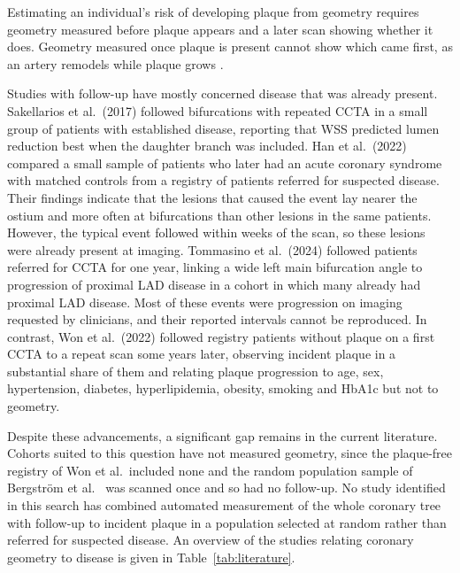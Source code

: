 Estimating an individual's risk of developing plaque from geometry requires geometry measured before
plaque appears and a later scan showing whether it does.
Geometry measured once plaque is present cannot show which came first, as an artery remodels while
plaque grows \cite{glagov1987remodeling}.

Studies with follow-up have mostly concerned disease that was already present.
Sakellarios et al.\ (2017) \cite{sakellarios2017bifurcation} followed bifurcations with repeated
CCTA in a small group of patients with established disease, reporting that WSS predicted lumen
reduction best when the daughter branch was included.
Han et al.\ (2022) \cite{han2022plaque} compared a small sample of patients who later had an acute
coronary syndrome with matched controls from a registry of patients referred for suspected disease.
Their findings indicate that the lesions that caused the event lay nearer the ostium and more often
at bifurcations than other lesions in the same patients.
However, the typical event followed within weeks of the scan, so these lesions were already present
at imaging.
Tommasino et al.\ (2024) \cite{tommasino2024clap} followed patients referred for CCTA for one year,
linking a wide left main bifurcation angle to progression of proximal LAD disease in a cohort in which
many already had proximal LAD disease.
Most of these events were progression on imaging requested by clinicians, and their reported
intervals cannot be reproduced.
In contrast, Won et al.\ (2022) \cite{won2022paradigm} followed registry patients without plaque on
a first CCTA to a repeat scan some years later, observing incident plaque in a substantial share of them
and relating plaque progression to age, sex, hypertension, diabetes, hyperlipidemia, obesity,
smoking and HbA1c but not to geometry.

Despite these advancements, a significant gap remains in the current literature.
Cohorts suited to this question have not measured geometry, since the plaque-free registry of Won
et al.\ included none and the random population sample of Bergstr\"om et al.\
\cite{bergstrom2021scapis} was scanned once and so had no follow-up.
No study identified in this search has combined automated measurement of the whole coronary tree with
follow-up to incident plaque in a population selected at random rather than referred for suspected
disease.
An overview of the studies relating coronary geometry to disease is given in
Table~\ref{tab:literature}.

